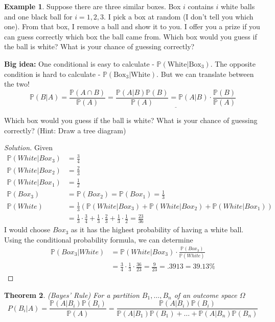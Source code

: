 \documentclass[12pt]{article}
\newcommand{\bbP}{\mathbb{P}}
\renewcommand{\_}[1]{\underline{ #1 }}
\newtheorem{theorem}{Theorem}[section]
\theoremstyle{definition}
\newtheorem{example}[theorem]{Example}
\numberwithin{equation}{subsection}
\begin{document}
\begin{example}
	Suppose there are three similar boxes. Box $i$ contains $i$ white balls and one black ball for $i=1,2,3$. I pick a box at random (I don't tell you which one). From that box, I remove a ball and show it to you. I offer you a prize if you can guess correctly which box the ball came from. Which box would you guess if the ball is white? What is your chance of guessing correctly?
	
	\textbf{Big idea:} One conditional is easy to calculate - $\bbP(\text{White} | \text{Box}_3)$. The opposite condition is hard to calculate - $\bbP(\text{Box}_3|\text{White})$. But we can translate between the two!	
	\[\bbP(B|A)=\dfrac{\bbP(A\cap B)}{\bbP(A)}=\_{\frac{\bbP(A|B)\bbP(B)}{\bbP(A)}=\bbP(A|B)\cdot \frac{\bbP(B)}{\bbP(A)}}\]
	
	 Which box would you guess if the ball is white? What is your chance of guessing correctly? (Hint: Draw a tree diagram)

	\begin{proof}[Solution]
		Given \\
		\begin{align*}
			\bbP(White|Box_3)&=\frac{3}{4} \\
			\bbP(White|Box_2)&=\frac{2}{3} \\
			\bbP(White|Box_1)&=\frac{1}{2} \\
			\bbP(Box_3)&=\bbP(Box_2)=\bbP(Box_1)=\frac{1}{3} \\
			\bbP(White)&=\frac{1}{3}(\bbP(White|Box_3)+\bbP(White|Box_2)+\bbP(White|Box_1)) \\
				&=\frac{1}{3}\cdot \frac{3}{4}+\frac{1}{3}\cdot \frac{2}{3}+\frac{1}{3}\cdot \frac{1}{2}=\frac{23}{36}
		\end{align*}
		I would choose $Box_3$ as it has the highest probability of having a white ball. Using the conditional probability formula, we can determine
		\begin{align*}
			\bbP(Box_3|White)&=\bbP(White|Box_3)\cdot \frac{\bbP(Box_3)}{\bbP(White)} \\
				&=\frac{3}{4}\cdot \frac{1}{3}\cdot \frac{36}{23}=\frac{9}{23}=.3913=39.13\%
		\end{align*}
	\end{proof}

\end{example}


\begin{theorem}\label{Bayes}
	(Bayes' Rule)
	For a partition $B_1,\dots, B_n$ of an outcome space $\Omega$ \[P(B_i|A)=\dfrac{\bbP(A|B_i)\bbP(B_i)}{\bbP(A)}=\dfrac{\bbP(A|B_i)\bbP(B_i)}{\bbP(A|B_1)\bbP(B_1)+\dots +\bbP(A|B_n)\bbP(B_n)}\]
\end{theorem}
\end{document}
